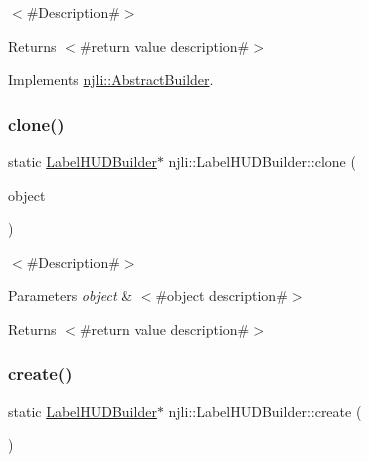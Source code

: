 $<$\#\+Description\#$>$

\begin{DoxyReturn}{Returns}
$<$\#return value description\#$>$ 
\end{DoxyReturn}


Implements \mbox{\hyperlink{classnjli_1_1_abstract_builder_aa1d220053e182c37b31b427499c6eacf}{njli\+::\+Abstract\+Builder}}.

\mbox{\label{classnjli_1_1_label_h_u_d_builder_a793337df080b9df135e1876e49e164ac}} 
\subsubsection{\texorpdfstring{clone()}{clone()}}
{\footnotesize\ttfamily static \mbox{\hyperlink{classnjli_1_1_label_h_u_d_builder}{Label\+H\+U\+D\+Builder}}$\ast$ njli\+::\+Label\+H\+U\+D\+Builder\+::clone (\begin{DoxyParamCaption}\item[{const \mbox{\hyperlink{classnjli_1_1_label_h_u_d_builder}{Label\+H\+U\+D\+Builder}} \&}]{object }\end{DoxyParamCaption})\hspace{0.3cm}{\ttfamily [static]}}

$<$\#\+Description\#$>$


\begin{DoxyParams}{Parameters}
{\em object} & $<$\#object description\#$>$\\
\hline
\end{DoxyParams}
\begin{DoxyReturn}{Returns}
$<$\#return value description\#$>$ 
\end{DoxyReturn}
\mbox{\label{classnjli_1_1_label_h_u_d_builder_abc86417c388dcf96cdae374ada398b5e}} 
\subsubsection{\texorpdfstring{create()}{create()}}
{\footnotesize\ttfamily static \mbox{\hyperlink{classnjli_1_1_label_h_u_d_builder}{Label\+H\+U\+D\+Builder}}$\ast$ njli\+::\+Label\+H\+U\+D\+Builder\+::create (\begin{DoxyParamCaption}{ }\end{DoxyParamCaption})\hspace{0.3cm}{\ttfamily [static]}}

